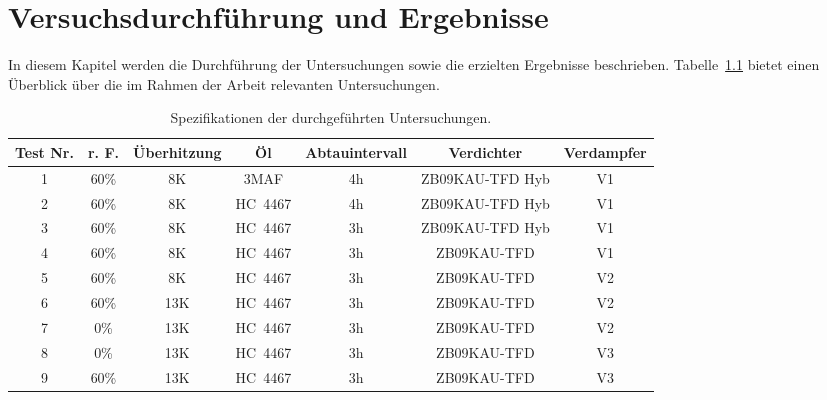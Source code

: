 
\chapter{Versuchsdurchführung und Ergebnisse}
\label{cha:Versuchsdurchführung}

In diesem Kapitel werden die Durchführung der Untersuchungen sowie die erzielten Ergebnisse beschrieben. Tabelle~\ref{tab:alltests} bietet einen Überblick über die im Rahmen der Arbeit relevanten Untersuchungen.

\begin{table}[h!]
\centering
\caption{Spezifikationen der durchgeführten Untersuchungen.}
\label{tab:alltests}
\begin{tabular}{|ccccccc|}
\hline
Test Nr.              & r. F.                     & Überhitzung              & Öl                               & Abtauintervall          & Verdichter                           & Verdampfer \\ \hline
\multicolumn{1}{|c|}{1} & \multicolumn{1}{c|}{60\%} & \multicolumn{1}{c|}{8K}  & \multicolumn{1}{c|}{3MAF}        & \multicolumn{1}{c|}{4h} & \multicolumn{1}{c|}{ZB09KAU-TFD Hyb} & V1       \\
\multicolumn{1}{|c|}{2} & \multicolumn{1}{c|}{60\%} & \multicolumn{1}{c|}{8K}  & \multicolumn{1}{c|}{HC~4467} & \multicolumn{1}{c|}{4h} & \multicolumn{1}{c|}{ZB09KAU-TFD Hyb} & V1        \\
\multicolumn{1}{|c|}{3} & \multicolumn{1}{c|}{60\%} & \multicolumn{1}{c|}{8K}  & \multicolumn{1}{c|}{HC~4467} & \multicolumn{1}{c|}{3h} & \multicolumn{1}{c|}{ZB09KAU-TFD Hyb} & V1        \\
\multicolumn{1}{|c|}{4} & \multicolumn{1}{c|}{60\%} & \multicolumn{1}{c|}{8K}  & \multicolumn{1}{c|}{HC~4467} & \multicolumn{1}{c|}{3h} & \multicolumn{1}{c|}{ZB09KAU-TFD}     & V1        \\
\multicolumn{1}{|c|}{5} & \multicolumn{1}{c|}{60\%} & \multicolumn{1}{c|}{8K}  & \multicolumn{1}{c|}{HC~4467} & \multicolumn{1}{c|}{3h} & \multicolumn{1}{c|}{ZB09KAU-TFD}     & V2    \\
\multicolumn{1}{|c|}{6} & \multicolumn{1}{c|}{60\%} & \multicolumn{1}{c|}{13K} & \multicolumn{1}{c|}{HC~4467} & \multicolumn{1}{c|}{3h} & \multicolumn{1}{c|}{ZB09KAU-TFD}     & V2    \\
\multicolumn{1}{|c|}{7} & \multicolumn{1}{c|}{0\%}  & \multicolumn{1}{c|}{13K} & \multicolumn{1}{c|}{HC~4467} & \multicolumn{1}{c|}{3h} & \multicolumn{1}{c|}{ZB09KAU-TFD}     & V2    \\
\multicolumn{1}{|c|}{8} & \multicolumn{1}{c|}{0\%}  & \multicolumn{1}{c|}{13K} & \multicolumn{1}{c|}{HC~4467} & \multicolumn{1}{c|}{3h} & \multicolumn{1}{c|}{ZB09KAU-TFD}     & V3    \\
\multicolumn{1}{|c|}{9} & \multicolumn{1}{c|}{60\%} & \multicolumn{1}{c|}{13K} & \multicolumn{1}{c|}{HC~4467} & \multicolumn{1}{c|}{3h} & \multicolumn{1}{c|}{ZB09KAU-TFD}     & V3    \\ \hline
\end{tabular}
\end{table}



